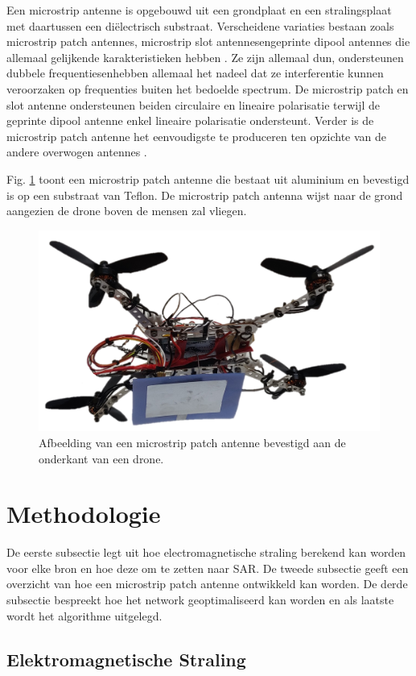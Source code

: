 \documentclass[twocolumn]{phdsymp_dutch}
\begin{document}
Een microstrip antenne is opgebouwd uit een grondplaat en een stralingsplaat met daartussen een di\"electrisch substraat.
Verscheidene variaties bestaan zoals microstrip patch antennes, microstrip slot antennesengeprinte dipool antennes 
die allemaal gelijkende karakteristieken hebben \cite{J13_microstripadvantages,J14_antennadesign}. 
Ze zijn allemaal dun, ondersteunen dubbele frequentiesenhebben allemaal het nadeel dat 
ze interferentie kunnen veroorzaken op frequenties buiten het bedoelde spectrum. 
De microstrip patch en slot antenne ondersteunen beiden circulaire en lineaire polarisatie terwijl de geprinte dipool antenne enkel 
lineaire polarisatie ondersteunt. Verder is de microstrip patch antenne het eenvoudigste te produceren ten opzichte 
van de andere overwogen antennes \cite{J13_microstripadvantages}. 

Fig. \ref{fig:exampleDrone} toont een microstrip patch antenne die bestaat 
uit aluminium en bevestigd is op een substraat van Teflon. De microstrip patch antenna 
wijst naar de grond aangezien de drone boven de mensen zal vliegen.

\begin{figure}[h]
\centering
  \includegraphics[width=0.5\linewidth]{drone.png}
  \caption{Afbeelding van een microstrip patch antenne bevestigd aan de onderkant van een drone. }
  \label{fig:exampleDrone}
\end{figure}

\section{Methodologie}

De eerste subsectie legt uit hoe electromagnetische straling berekend kan worden voor elke bron 
en hoe deze om te zetten naar \gls{SAR}.
De tweede subsectie geeft een overzicht van hoe een microstrip patch antenne ontwikkeld kan worden. 
De derde subsectie bespreekt hoe het network geoptimaliseerd kan worden en als laatste wordt het algorithme
uitgelegd.

\subsection{Elektromagnetische Straling}
\end{document}
